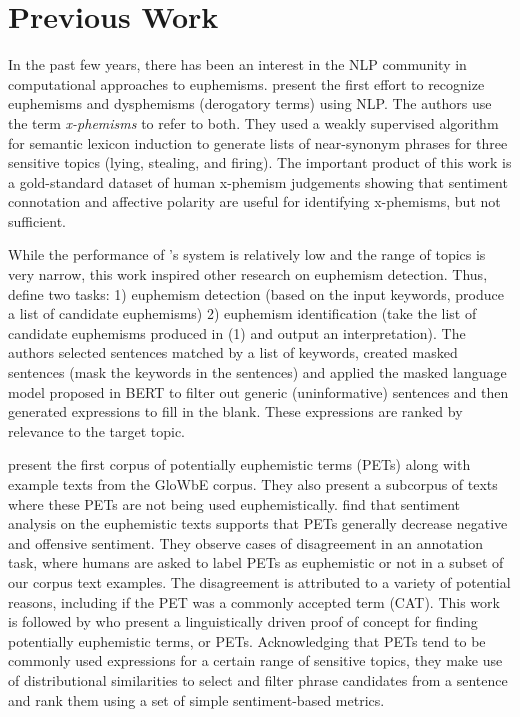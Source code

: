 \documentclass[11pt]{article}
\begin{document}
\section{Previous Work}
In the past few years, there has been an interest in the NLP community in computational approaches to euphemisms. \citet{felt2020recognizing} present the first effort to recognize euphemisms and dysphemisms (derogatory terms) using NLP. The authors use the term  \emph{x-phemisms} to refer to both. They used a weakly supervised algorithm for semantic lexicon induction \cite{thelen2002bootstrapping} to generate lists of near-synonym phrases for three sensitive topics (lying, stealing, and firing). The important product of this work is a gold-standard dataset of human x-phemism judgements showing that sentiment connotation and affective polarity are useful for identifying x-phemisms, but not sufficient. 

While the performance of \citet{felt2020recognizing}'s system is relatively low and the range of topics is very narrow, this work inspired other research on euphemism detection.  Thus, \citet{zhu2021self} define two tasks:  1) euphemism detection (based on the input keywords, produce a list of candidate euphemisms) 2) euphemism identification (take the list of candidate euphemisms produced in (1) and output an interpretation). The authors selected sentences matched by a list of keywords, created masked sentences (mask the keywords in the sentences) and applied the masked language model proposed in BERT \cite{devlin2018bert} to filter out generic (uninformative) sentences and then generated expressions to fill in the blank. These expressions are ranked by relevance to the target topic.

\citet{gavidia-etal-2022-cats} present the first corpus of potentially euphemistic terms (PETs) along with example texts from the GloWbE corpus. They also present a subcorpus of texts where these PETs are not being used euphemistically. \citet{gavidia-etal-2022-cats} find that sentiment analysis on the euphemistic texts supports that PETs generally decrease negative and offensive sentiment. They observe cases of disagreement in an annotation task, where humans are asked to label PETs as euphemistic or not in a subset of our corpus text examples. The disagreement is attributed to a variety of potential reasons, including if the PET was a commonly accepted term (CAT). This work is followed by \citet{lee2022searching} who present a linguistically driven proof of concept for finding potentially euphemistic terms, or PETs. Acknowledging that PETs tend to be commonly used expressions for a certain range of sensitive topics, they make use of distributional similarities to select and filter phrase candidates from a sentence and rank them using a set of simple sentiment-based metrics. 
\end{document}
